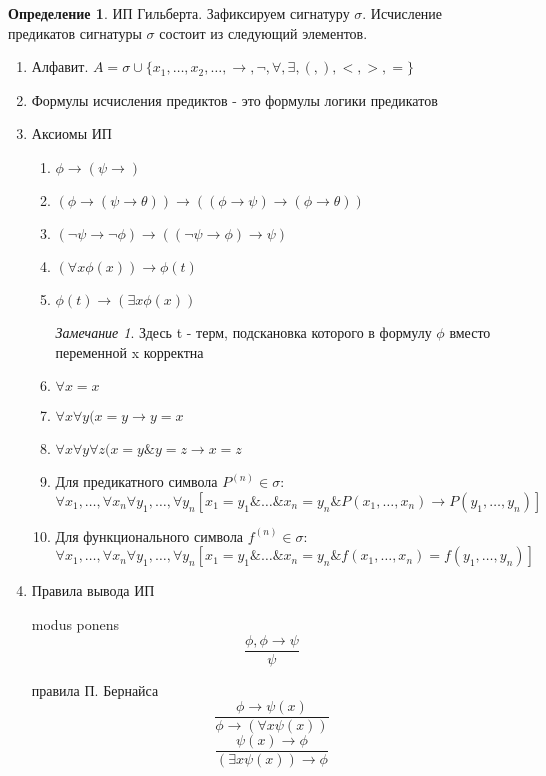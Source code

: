 \documentclass[a4paper]{article}
\theoremstyle{definition}
\newtheorem*{definition}{Определение}
\theoremstyle{remark}
\newtheorem*{remark}{Замечание}
\begin{document}
	\begin{definition}
		ИП Гильберта. 
		Зафиксируем сигнатуру $\sigma$. Исчисление предикатов сигнатуры $\sigma$ состоит из следующий элементов.
		\begin{enumerate}
			\item Алфавит. $A = \sigma \cup \{x_1, \dots, x_2, \dots, \rightarrow, \neg, \forall, \exists, (, ), <,> , =\}$
			\item Формулы исчисления предиктов - это формулы логики предикатов
			\item Аксиомы ИП
			\begin{enumerate}
				\item $\phi \rightarrow (\psi \rightarrow)$
				\item $(\phi \rightarrow (\psi \rightarrow \theta)) \rightarrow ((\phi \rightarrow \psi) \rightarrow (\phi \rightarrow \theta))$
				\item $(\neg \psi \rightarrow \neg \phi) \rightarrow ((\neg \psi \rightarrow \phi) \rightarrow \psi)$
				\item $(\forall x \phi(x)) \rightarrow \phi(t)$
				\item $\phi(t) \rightarrow (\exists x \phi(x))$
				\begin{remark}
					Здесь t - терм, подскановка которого в формулу $\phi$ вместо переменной x корректна
				\end{remark}
				\item $\forall x = x$
				\item $\forall x\forall y (x = y \rightarrow y = x$
				\item $\forall x \forall y \forall z (x = y \& y = z \rightarrow x = z$
				\item Для предикатного символа $P^{(n)} \in \sigma$: $$\forall x_1, \dots, \forall x_n \forall y_1, \dots, \forall y_n [x_1 = y_1 \& \dots \& x_n = y_n \& P(x_1, \dots, x_n) \rightarrow P(y_1, \dots, y_n)]$$
				\item Для функционального символа $f^{(n)} \in \sigma$: $$\forall x_1, \dots, \forall x_n \forall y_1, \dots, \forall y_n [x_1 = y_1 \& \dots \& x_n = y_n \& f(x_1, \dots, x_n) = f(y_1, \dots, y_n)]$$
			\end{enumerate}
			\item Правила вывода ИП

				modus ponens $$\frac{\phi, \phi \rightarrow \psi}{\psi}$$

				правила П. Бернайса $$\frac{\phi \rightarrow \psi(x)}{\phi \rightarrow (\forall x \psi(x))}$$ $$\frac{\psi(x) \rightarrow \phi}{(\exists x \psi(x)) \rightarrow \phi}$$
		\end{enumerate}
	\end{definition}
\end{document}
